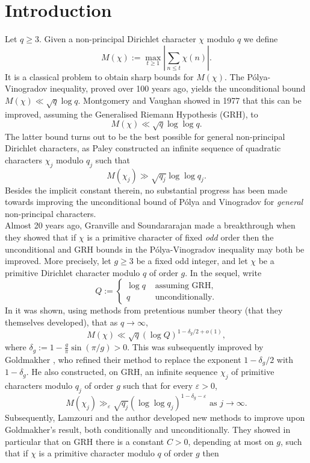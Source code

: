 \documentclass[10pt]{amsart}
\theoremstyle{definition}
\newcommand{\ra}{\rightarrow}
\newcommand{\e}{\varepsilon}
\begin{document}
\section{Introduction}
Let $q \geq 3$. Given a non-principal Dirichlet character $\chi$ modulo $q$ we define
$$
M(\chi) := \max_{t \geq 1} \left|\sum_{n \leq t} \chi(n)\right|.
$$
It is a classical problem to obtain sharp bounds for $M(\chi)$. The P\'{o}lya-Vinogradov inequality, proved over 100 years ago, yields the unconditional bound $M(\chi) \ll \sqrt{q}\log q$. Montgomery and Vaughan \cite{MV} showed in 1977 that this can be improved, assuming the Generalised Riemann Hypothesis (GRH), to 
$$
M(\chi) \ll \sqrt{q}\log\log q.
$$ 
The latter bound turns out to be the best possible for general non-principal Dirichlet characters, as Paley \cite{Pal} constructed an infinite sequence of quadratic characters $\chi_j$ modulo $q_j$ such that 
$$
M(\chi_j) \gg \sqrt{q_j} \log\log q_j.
$$ 
Besides the implicit constant therein, no substantial progress has been made towards improving the unconditional bound of P\'{o}lya and Vinogradov for \emph{general} non-principal characters. \\
Almost 20 years ago, Granville and Soundararajan \cite{GSPret} made a breakthrough when they showed that if $\chi$ is a primitive character of fixed \emph{odd} order then the unconditional and GRH bounds in the P\'{o}lya-Vinogradov inequality may both be improved. More precisely, let $g \geq 3$ be a fixed odd integer, and let $\chi$ be a primitive Dirichlet character modulo $q$ of order $g$. In the sequel, write 
$$
Q := \begin{cases} \log q &\text{ assuming GRH,} \\ q &\text{ unconditionally.}\end{cases}
$$
In \cite{GSPret} it was shown, using methods from pretentious number theory (that they themselves developed), that as $q \ra \infty$,
$$
M(\chi) \ll \sqrt{q} (\log Q)^{1-\delta_g/2+o(1)},
$$
where $\delta_g := 1-\tfrac{g}{\pi}\sin(\pi/g)>0$. This was subsequently improved by Goldmakher \cite{Gold}, who refined their method to replace the exponent $1-\delta_g/2$ with $1-\delta_g$. He also constructed, on GRH, an infinite sequence $\chi_j$ of primitive characters modulo $q_j$ of order $g$ such that for every $\e > 0$,
$$
M(\chi_j) \gg_{\e} \sqrt{q_j} (\log\log q_j)^{1-\delta_g - \e} \text{ as } j \ra \infty.
$$
Subsequently, Lamzouri and the author \cite{LamMan} developed new methods to improve upon Goldmakher's result, both conditionally and unconditionally. They showed in particular that on GRH there is a constant $C > 0$, depending at most on $g$, such that if $\chi$ is a primitive character modulo $q$ of order $g$ then
\end{document}
